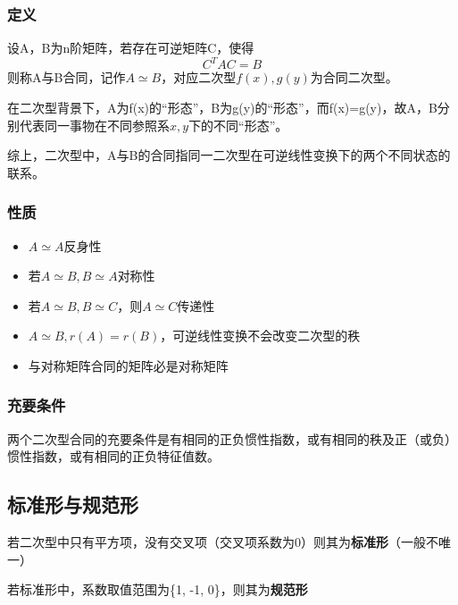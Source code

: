 \subsubsection{定义}
设A，B为n阶矩阵，若存在可逆矩阵C，使得\[C^TAC = B\]
则称A与B合同，记作\(A \simeq B\)，对应二次型\(f(x), g(y)\)为合同二次型。

在二次型背景下，A为f(x)的“形态”，B为g(y)的“形态”，而f(x)=g(y)，故A，B分别代表同一事物在不同参照系\(x, y\)下的不同“形态”。

综上，二次型中，A与B的合同指同一二次型在可逆线性变换下的两个不同状态的联系。


\subsubsection{性质}
\begin{itemize}
    \item \(A \simeq A\)反身性
    \item 若\(A \simeq B, B \simeq A\)对称性
    \item 若\(A \simeq B, B \simeq C\)，则\(A \simeq C\)传递性
    \item \(A \simeq B, r(A) = r(B)\)，可逆线性变换不会改变二次型的秩
    \item 与对称矩阵合同的矩阵必是对称矩阵
\end{itemize}


\subsubsection{充要条件}
两个二次型合同的充要条件是有相同的正负惯性指数，或有相同的秩及正（或负）惯性指数，或有相同的正负特征值数。


\subsection{标准形与规范形}

若二次型中只有平方项，没有交叉项（交叉项系数为0）则其为\textbf{标准形}（一般不唯一）

若标准形中，系数取值范围为\{1, -1, 0\}，则其为\textbf{规范形}


